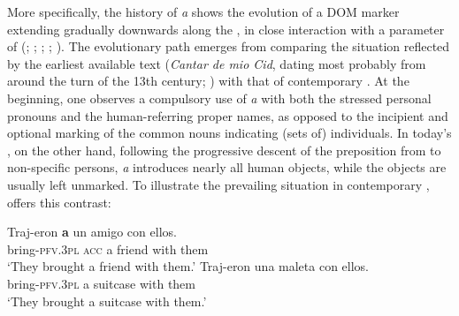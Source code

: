 \documentclass[output=paper]{LSP/langsci}
\begin{document}
 More specifically, the history of  \textit{a} shows the evolution of a DOM marker extending gradually downwards along the , in close interaction with a parameter of  (\citealt{Garciaetal1995Palabra}; \citealt{Melis1995Objetodirecto}; \citealt{Aissen2003Differential}; \citealt{vonHeusingeretal2005Evolution}; \citealt{Laca2006Objeto}). The evolutionary path emerges from comparing the situation reflected by the earliest available text (\textit{Cantar de mio Cid}, dating most probably from around the turn of the 13th century; \cf \citealt[8]{Montaner1993Cantar}) with that of contemporary . At the beginning, one observes a compulsory use of \textit{a} with both the stressed personal pronouns and the human-referring proper names, as opposed to the incipient and optional marking of the common nouns indicating  (sets of) individuals. In today’s , on the other hand, following the progressive descent of the preposition from  to non-specific  persons, \textit{a} introduces nearly all human objects, while the  objects are usually left unmarked. To illustrate the prevailing situation in contemporary , \citet[1781–1782]{Torrego1999Gramatica} offers this contrast:

\begin{exe}
\ex%
\label{04-me-ex:2}
\begin{xlist}
\ex%
\label{04-me-ex:2a}
\gll Traj-eron \textbf{a} un amigo con ellos.\\
 bring-\textsc{pfv.3pl} \textsc{acc} a friend with them\\
\glt ‘They brought a friend with them.’ 
\ex%
\label{04-me-ex:2b}
\gll Traj-eron una maleta con ellos.\\
bring-\textsc{pfv.3pl} a suitcase with them\\
\glt ‘They brought a suitcase with them.’ 
\end{xlist}
\end{exe} 
\end{document}
